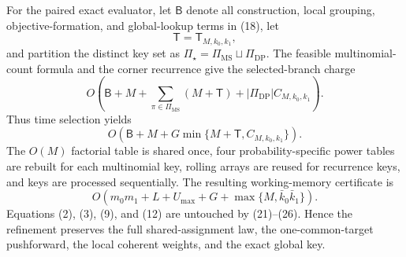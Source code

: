 For the paired exact evaluator, let \(\mathsf B\) denote all construction, local grouping, objective-formation, and global-lookup terms in (18), let
\[
\mathsf T=\mathsf T_{M,k_0,k_1},
\]
and partition the distinct key set as
\(\Pi_\star=\Pi_{\mathrm{MS}}\sqcup\Pi_{\mathrm{DP}}\).
The feasible multinomial-count formula and the corner recurrence give the selected-branch charge
\[
O\!\left(
\mathsf B+M+
\sum_{\pi\in\Pi_{\mathrm{MS}}}(M+\mathsf T)
+|\Pi_{\mathrm{DP}}|C_{M,k_0,k_1}
\right). \tag{24}
\]
Thus time selection yields
\[
O\!\left(
\mathsf B+M+
G\min\{M+\mathsf T,C_{M,k_0,k_1}\}
\right). \tag{25}
\]
The \(O(M)\) factorial table is shared once, four probability-specific power tables are rebuilt for each multinomial key, rolling arrays are reused for recurrence keys, and keys are processed sequentially. The resulting working-memory certificate is
\[
O\!\left(
m_0m_1+L+U_{\max}+G+
\max\{M,\bar k_0\bar k_1\}
\right). \tag{26}
\]
Equations (2), (3), (9), and (12) are untouched by (21)--(26). Hence the refinement preserves the full shared-assignment law, the one-common-target pushforward, the local coherent weights, and the exact global key.
